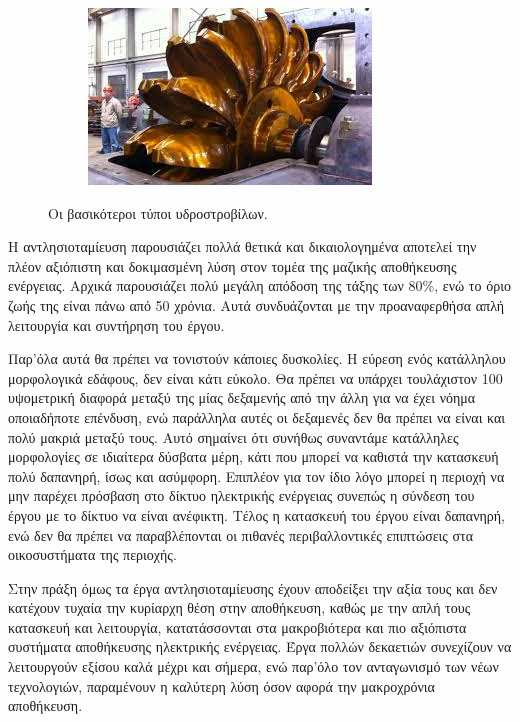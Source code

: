 \documentclass[12pt]{report}
\begin{document}
\begin{figure}[b]
\begin{subfigure}[b]{0.3\textwidth}
         \centering
         \includegraphics[width=\textwidth]{pelton}
         \caption{{}}
         \label{fig:pelton}
     \end{subfigure}
        \caption{Οι βασικότεροι τύποι υδροστροβίλων.}
				\captionsetup{name=Εικόνα}
        \label{fig:hydro-turbines}
\end{figure}

Η αντλησιοταμίευση παρουσιάζει πολλά θετικά και δικαιολογημένα αποτελεί την πλέον αξιόπιστη και δοκιμασμένη λύση στον τομέα της μαζικής αποθήκευσης ενέργειας. Αρχικά παρουσιάζει πολύ μεγάλη απόδοση της τάξης των 80\%, 
ενώ το όριο ζωής της είναι πάνω από 50 χρόνια. Αυτά συνδυάζονται με την προαναφερθήσα απλή λειτουργία και συντήρηση του έργου.

Παρ'όλα αυτά θα πρέπει να τονιστούν κάποιες δυσκολίες. Η εύρεση ενός κατάλληλου μορφολογικά εδάφους, δεν είναι κάτι εύκολο. Θα πρέπει να υπάρχει τουλάχιστον 100{} υψομετρική διαφορά μεταξύ της μίας δεξαμενής 
από την άλλη για να έχει νόημα οποιαδήποτε επένδυση, ενώ παράλληλα αυτές οι δεξαμενές δεν θα πρέπει να είναι και πολύ μακριά μεταξύ τους. Αυτό σημαίνει ότι συνήθως συναντάμε κατάλληλες μορφολογίες σε ιδιαίτερα δύσβατα μέρη, 
κάτι που μπορεί να καθιστά την κατασκευή πολύ δαπανηρή, ίσως και ασύμφορη. Επιπλέον για τον ίδιο λόγο μπορεί η περιοχή να μην παρέχει πρόσβαση στο δίκτυο ηλεκτρικής ενέργειας συνεπώς η σύνδεση του έργου με το δίκτυο να είναι 
ανέφικτη. Τέλος η κατασκευή του έργου είναι δαπανηρή, ενώ δεν θα πρέπει να παραβλέπονται οι πιθανές περιβαλλοντικές επιπτώσεις στα οικοσυστήματα της περιοχής.

Στην πράξη όμως τα έργα αντλησιοταμίευσης έχουν αποδείξει την αξία τους και δεν κατέχουν τυχαία την κυρίαρχη θέση στην αποθήκευση, καθώς με την απλή τους κατασκευή και λειτουργία, 
κατατάσσονται στα μακροβιότερα και πιο αξιόπιστα συστήματα αποθήκευσης ηλεκτρικής ενέργειας. Έργα πολλών δεκαετιών συνεχίζουν να λειτουργούν εξίσου καλά μέχρι και σήμερα, ενώ παρ'όλο τον ανταγωνισμό των νέων τεχνολογιών,
παραμένουν η καλύτερη λύση όσον αφορά την μακροχρόνια αποθήκευση.
\vfill
\end{document}
